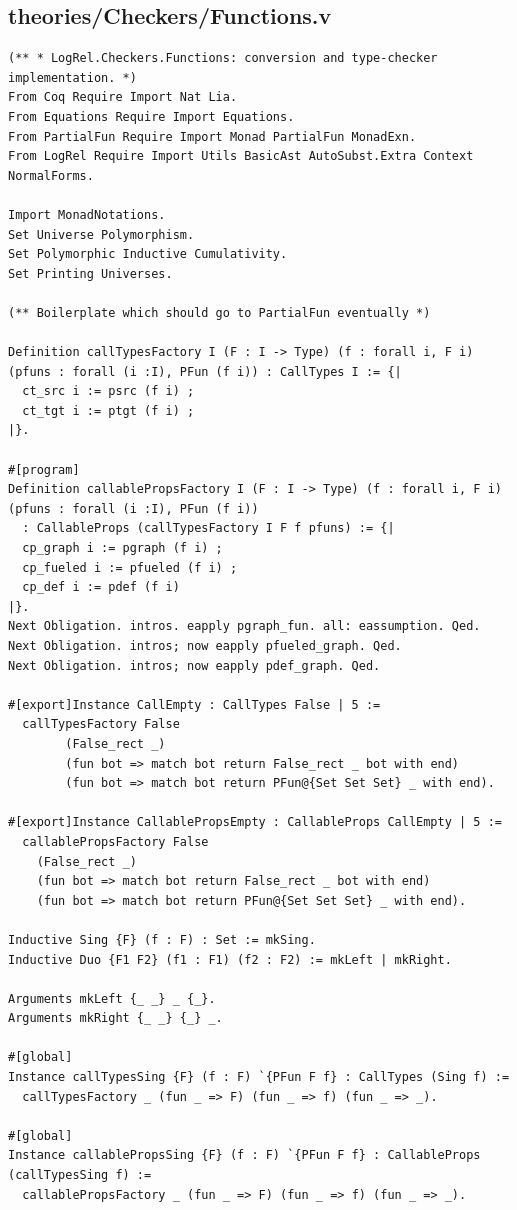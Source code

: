 \subsection*{theories/Checkers/Functions.v}
\begin{lstlisting}
(** * LogRel.Checkers.Functions: conversion and type-checker implementation. *)
From Coq Require Import Nat Lia.
From Equations Require Import Equations.
From PartialFun Require Import Monad PartialFun MonadExn.
From LogRel Require Import Utils BasicAst AutoSubst.Extra Context NormalForms.

Import MonadNotations.
Set Universe Polymorphism.
Set Polymorphic Inductive Cumulativity.
Set Printing Universes.

(** Boilerplate which should go to PartialFun eventually *)

Definition callTypesFactory I (F : I -> Type) (f : forall i, F i) (pfuns : forall (i :I), PFun (f i)) : CallTypes I := {|
  ct_src i := psrc (f i) ;
  ct_tgt i := ptgt (f i) ;
|}.

#[program]
Definition callablePropsFactory I (F : I -> Type) (f : forall i, F i) (pfuns : forall (i :I), PFun (f i))
  : CallableProps (callTypesFactory I F f pfuns) := {|
  cp_graph i := pgraph (f i) ;
  cp_fueled i := pfueled (f i) ;
  cp_def i := pdef (f i)
|}.
Next Obligation. intros. eapply pgraph_fun. all: eassumption. Qed.
Next Obligation. intros; now eapply pfueled_graph. Qed.
Next Obligation. intros; now eapply pdef_graph. Qed.

#[export]Instance CallEmpty : CallTypes False | 5 :=
  callTypesFactory False
        (False_rect _)
        (fun bot => match bot return False_rect _ bot with end)
        (fun bot => match bot return PFun@{Set Set Set} _ with end).

#[export]Instance CallablePropsEmpty : CallableProps CallEmpty | 5 :=
  callablePropsFactory False
    (False_rect _)
    (fun bot => match bot return False_rect _ bot with end)
    (fun bot => match bot return PFun@{Set Set Set} _ with end).

Inductive Sing {F} (f : F) : Set := mkSing.
Inductive Duo {F1 F2} (f1 : F1) (f2 : F2) := mkLeft | mkRight.

Arguments mkLeft {_ _} _ {_}.
Arguments mkRight {_ _} {_} _.

#[global]
Instance callTypesSing {F} (f : F) `{PFun F f} : CallTypes (Sing f) :=
  callTypesFactory _ (fun _ => F) (fun _ => f) (fun _ => _).

#[global]
Instance callablePropsSing {F} (f : F) `{PFun F f} : CallableProps (callTypesSing f) :=
  callablePropsFactory _ (fun _ => F) (fun _ => f) (fun _ => _).


\end{lstlisting}

